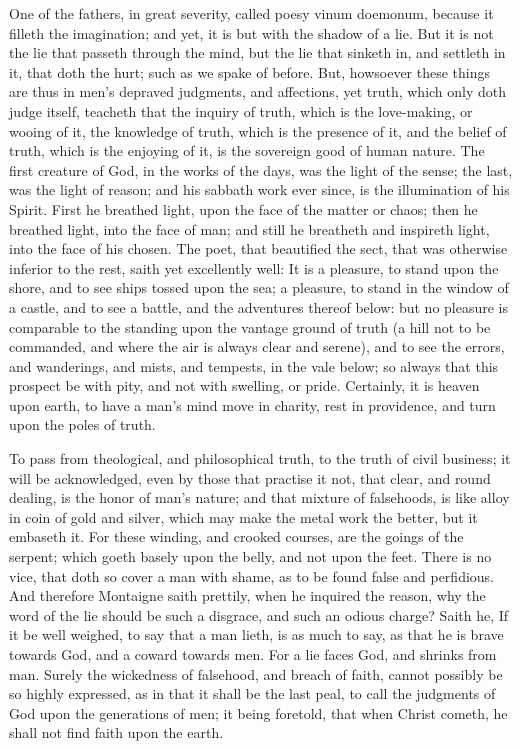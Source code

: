 \documentclass[12pt]{article}
\begin{document}
One of the fathers, in great severity, called poesy vinum
doemonum, because it filleth the imagination; and yet, it is but
with the shadow of a lie. But it is not the lie that passeth through
the mind, but the lie that sinketh in, and settleth in it, that doth
the hurt; such as we spake of before. But, howsoever these things
are thus in men's depraved judgments, and affections, yet truth, which
only doth judge itself, teacheth that the inquiry of truth, which is
the love-making, or wooing of it, the knowledge of truth, which is the
presence of it, and the belief of truth, which is the enjoying of
it, is the sovereign good of human nature. The first creature of
God, in the works of the days, was the light of the sense; the last,
was the light of reason; and his sabbath work ever since, is the
illumination of his Spirit. First he breathed light, upon the face
of the matter or chaos; then he breathed light, into the face of
man; and still he breatheth and inspireth light, into the face of
his chosen. The poet, that beautified the sect, that was otherwise
inferior to the rest, saith yet excellently well: It is a pleasure, to
stand upon the shore, and to see ships tossed upon the sea; a
pleasure, to stand in the window of a castle, and to see a battle, and
the adventures thereof below: but no pleasure is comparable to the
standing upon the vantage ground of truth (a hill not to be commanded,
and where the air is always clear and serene), and to see the
errors, and wanderings, and mists, and tempests, in the vale below; so
always that this prospect be with pity, and not with swelling, or
pride. Certainly, it is heaven upon earth, to have a man's mind move
in charity, rest in providence, and turn upon the poles of truth.

To pass from theological, and philosophical truth, to the truth of
civil business; it will be acknowledged, even by those that practise
it not, that clear, and round dealing, is the honor of man's nature;
and that mixture of falsehoods, is like alloy in coin of gold and
silver, which may make the metal work the better, but it embaseth
it. For these winding, and crooked courses, are the goings of the
serpent; which goeth basely upon the belly, and not upon the feet.
There is no vice, that doth so cover a man with shame, as to be
found false and perfidious. And therefore Montaigne saith prettily,
when he inquired the reason, why the word of the lie should be such
a disgrace, and such an odious charge? Saith he, If it be well
weighed, to say that a man lieth, is as much to say, as that he is
brave towards God, and a coward towards men. For a lie faces God,
and shrinks from man. Surely the wickedness of falsehood, and breach
of faith, cannot possibly be so highly expressed, as in that it
shall be the last peal, to call the judgments of God upon the
generations of men; it being foretold, that when Christ cometh, he
shall not find faith upon the earth.
\end{document}

